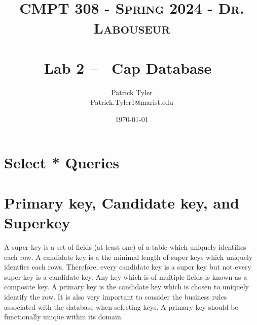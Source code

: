 \documentclass[letterpaper, 10pt]{article}
\title{	
   \normalfont \normalsize 
   \textsc{CMPT 308 - Spring 2024 - Dr. Labouseur} \\[10pt] %
   \horrule{0.5pt} \\[0.25cm] 	%
   \huge Lab 2 -- ~Cap Database\     	    %
   \horrule{0.5pt} \\[0.25cm] 	%
}
\author{Patrick Tyler \\ \normalsize Patrick.Tyler1@marist.edu}
\date{\normalsize\today} 	%
\begin{document}
\maketitle %


\section{Select * Queries}


\pagebreak



\section{Primary key, Candidate key, and Superkey}
A super key is a set of fields (at least one) of a table which uniquely identifies each row.
A candidate key is a the minimal length of super keys which uniquely identfies each rows.
Therefore, every candidate key is a super key but not every super key is a candidate key.
Any key which is of multiple fields is known as a composite key.
A primary key is the candidate key which is chosen to uniquely identify the row.
It is also very important to consider the business rules associated with the database when selecting keys.
A primary key should be functionally unique within its domain.
\end{document}
